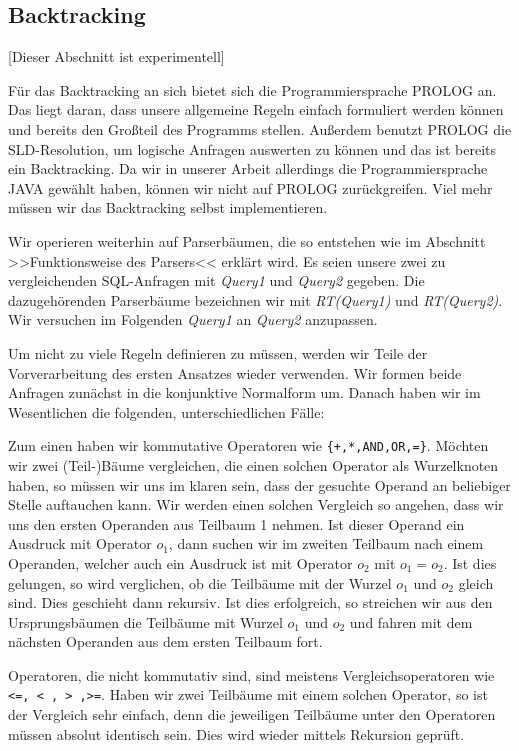 \subsection{Backtracking}

[Dieser Abschnitt ist experimentell]

Für das Backtracking an sich bietet sich die Programmiersprache PROLOG an. Das liegt daran, dass unsere allgemeine Regeln einfach formuliert werden können und bereits den Großteil des Programms stellen. Außerdem benutzt PROLOG die SLD-Resolution, um logische Anfragen auswerten zu können und das ist bereits ein Backtracking. Da wir in unserer Arbeit allerdings die Programmiersprache JAVA gewählt haben, können wir nicht auf PROLOG zurückgreifen. Viel mehr müssen wir das Backtracking selbst implementieren. 

Wir operieren weiterhin auf Parserbäumen, die so entstehen wie im Abschnitt >>Funktionsweise des Parsers<< erklärt wird. Es seien unsere zwei zu vergleichenden SQL-Anfragen mit \textit{Query1} und \textit{Query2} gegeben. Die dazugehörenden Parserbäume bezeichnen wir mit \textit{RT(Query1)} und \textit{RT(Query2)}. Wir versuchen im Folgenden \textit{Query1} an \textit{Query2} anzupassen.

Um nicht zu viele Regeln definieren zu müssen, werden wir Teile der Vorverarbeitung des ersten Ansatzes wieder verwenden. Wir formen beide Anfragen zunächst in die konjunktive Normalform um. Danach haben wir im Wesentlichen die folgenden, unterschiedlichen Fälle:

Zum einen haben wir kommutative Operatoren wie \verb|{+,*,AND,OR,=}|. Möchten wir zwei (Teil-)Bäume vergleichen, die einen solchen Operator als Wurzelknoten haben, so müssen wir uns im klaren sein, dass der gesuchte Operand an beliebiger Stelle auftauchen kann. Wir werden einen solchen Vergleich so angehen, dass wir uns den ersten Operanden aus Teilbaum 1 nehmen. Ist dieser Operand ein Ausdruck mit Operator $o_1$, dann suchen wir im zweiten Teilbaum nach einem Operanden, welcher auch ein Ausdruck ist mit Operator $o_2$ mit $o_1=o_2$. Ist dies gelungen, so wird verglichen, ob die Teilbäume mit der Wurzel $o_1$ und $o_2$ gleich sind. Dies geschieht dann rekursiv. Ist dies erfolgreich, so streichen wir aus den Ursprungsbäumen die Teilbäume mit Wurzel $o_1$ und $o_2$ und fahren mit dem nächsten Operanden aus dem ersten Teilbaum fort.

Operatoren, die nicht kommutativ sind, sind meistens Vergleichsoperatoren wie \verb|<=, < , > ,>=|. Haben wir zwei Teilbäume mit einem solchen Operator, so ist der Vergleich sehr einfach, denn die jeweiligen Teilbäume unter den Operatoren müssen absolut identisch sein. Dies wird wieder mittels Rekursion geprüft.

